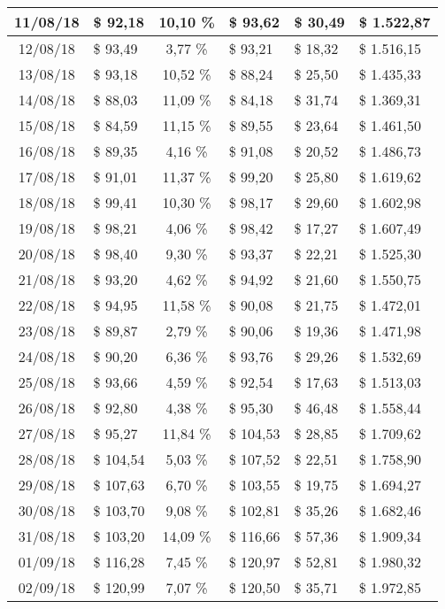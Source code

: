 \begin{center}
\begin{small}
\begin{longtable}{|c|l|c|l|l|l|}
11/08/18 & \$ 92,18 & 10,10 \% & \$ 93,62 & \$ 30,49 & \$ 1.522,87 \\ \hline
12/08/18 & \$ 93,49 & 3,77 \% & \$ 93,21 & \$ 18,32 & \$ 1.516,15 \\ \hline
13/08/18 & \$ 93,18 & 10,52 \% & \$ 88,24 & \$ 25,50 & \$ 1.435,33 \\ \hline
14/08/18 & \$ 88,03 & 11,09 \% & \$ 84,18 & \$ 31,74 & \$ 1.369,31 \\ \hline
15/08/18 & \$ 84,59 & 11,15 \% & \$ 89,55 & \$ 23,64 & \$ 1.461,50 \\ \hline
16/08/18 & \$ 89,35 & 4,16 \% & \$ 91,08 & \$ 20,52 & \$ 1.486,73 \\ \hline
17/08/18 & \$ 91,01 & 11,37 \% & \$ 99,20 & \$ 25,80 & \$ 1.619,62 \\ \hline
18/08/18 & \$ 99,41 & 10,30 \% & \$ 98,17 & \$ 29,60 & \$ 1.602,98 \\ \hline
19/08/18 & \$ 98,21 & 4,06 \% & \$ 98,42 & \$ 17,27 & \$ 1.607,49 \\ \hline
20/08/18 & \$ 98,40 & 9,30 \% & \$ 93,37 & \$ 22,21 & \$ 1.525,30 \\ \hline
21/08/18 & \$ 93,20 & 4,62 \% & \$ 94,92 & \$ 21,60 & \$ 1.550,75 \\ \hline
22/08/18 & \$ 94,95 & 11,58 \% & \$ 90,08 & \$ 21,75 & \$ 1.472,01 \\ \hline
23/08/18 & \$ 89,87 & 2,79 \% & \$ 90,06 & \$ 19,36 & \$ 1.471,98 \\ \hline
24/08/18 & \$ 90,20 & 6,36 \% & \$ 93,76 & \$ 29,26 & \$ 1.532,69 \\ \hline
25/08/18 & \$ 93,66 & 4,59 \% & \$ 92,54 & \$ 17,63 & \$ 1.513,03 \\ \hline
26/08/18 & \$ 92,80 & 4,38 \% & \$ 95,30 & \$ 46,48 & \$ 1.558,44 \\ \hline
27/08/18 & \$ 95,27 & 11,84 \% & \$ 104,53 & \$ 28,85 & \$ 1.709,62 \\ \hline
28/08/18 & \$ 104,54 & 5,03 \% & \$ 107,52 & \$ 22,51 & \$ 1.758,90 \\ \hline
29/08/18 & \$ 107,63 & 6,70 \% & \$ 103,55 & \$ 19,75 & \$ 1.694,27 \\ \hline
30/08/18 & \$ 103,70 & 9,08 \% & \$ 102,81 & \$ 35,26 & \$ 1.682,46 \\ \hline
31/08/18 & \$ 103,20 & 14,09 \% & \$ 116,66 & \$ 57,36 & \$ 1.909,34 \\ \hline
01/09/18 & \$ 116,28 & 7,45 \% & \$ 120,97 & \$ 52,81 & \$ 1.980,32 \\ \hline
02/09/18 & \$ 120,99 & 7,07 \% & \$ 120,50 & \$ 35,71 & \$ 1.972,85 \\ \hline

\end{longtable}
\end{small}
\end{center}
